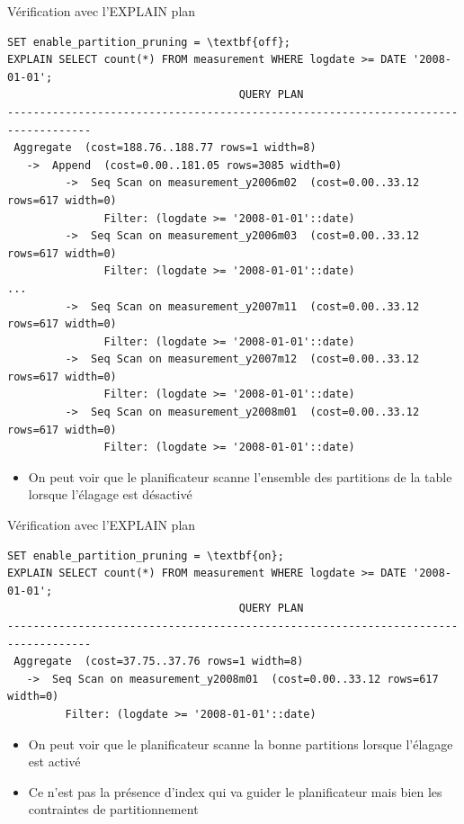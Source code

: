 \begin{frame}[fragile]{Vérification avec l'EXPLAIN plan}

\begin{tiny}
\begin{Verbatim}[commandchars=\#\{\}]
SET enable_partition_pruning = \textbf{off};
EXPLAIN SELECT count(*) FROM measurement WHERE logdate >= DATE '2008-01-01';
                                    QUERY PLAN
-----------------------------------------------------------------------------------
 Aggregate  (cost=188.76..188.77 rows=1 width=8)
   ->  Append  (cost=0.00..181.05 rows=3085 width=0)
         ->  Seq Scan on measurement_y2006m02  (cost=0.00..33.12 rows=617 width=0)
               Filter: (logdate >= '2008-01-01'::date)
         ->  Seq Scan on measurement_y2006m03  (cost=0.00..33.12 rows=617 width=0)
               Filter: (logdate >= '2008-01-01'::date)
...
         ->  Seq Scan on measurement_y2007m11  (cost=0.00..33.12 rows=617 width=0)
               Filter: (logdate >= '2008-01-01'::date)
         ->  Seq Scan on measurement_y2007m12  (cost=0.00..33.12 rows=617 width=0)
               Filter: (logdate >= '2008-01-01'::date)
         ->  Seq Scan on measurement_y2008m01  (cost=0.00..33.12 rows=617 width=0)
               Filter: (logdate >= '2008-01-01'::date)   
\end{Verbatim}
\end{tiny}

   \begin{itemize}
      \item On peut voir que le planificateur scanne l'ensemble des partitions de la table lorsque l'élagage est désactivé
   \end{itemize}

\end{frame}


\begin{frame}[fragile]{Vérification avec l'EXPLAIN plan}

\begin{tiny}
\begin{Verbatim}[commandchars=\#\{\}]
SET enable_partition_pruning = \textbf{on};
EXPLAIN SELECT count(*) FROM measurement WHERE logdate >= DATE '2008-01-01';
                                    QUERY PLAN
-----------------------------------------------------------------------------------
 Aggregate  (cost=37.75..37.76 rows=1 width=8)
   ->  Seq Scan on measurement_y2008m01  (cost=0.00..33.12 rows=617 width=0)
         Filter: (logdate >= '2008-01-01'::date)
\end{Verbatim}
\end{tiny}

   \begin{itemize}
      \item On peut voir que le planificateur scanne la bonne partitions lorsque l'élagage est activé
      \item Ce n'est pas la présence d'index qui va guider le planificateur mais bien les contraintes de partitionnement
   \end{itemize}

\end{frame}


